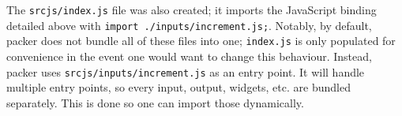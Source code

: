 \documentclass[10pt,]{krantz}
\makeatletter
\newenvironment{Shaded}{\begin{snugshade}}{\end{snugshade}}
\newcommand{\AttributeTok}[1]{\textcolor[rgb]{0.61,0.61,0.61}{#1}}
\newcommand{\ControlFlowTok}[1]{\textcolor[rgb]{0.27,0.27,0.27}{\textbf{#1}}}
\newcommand{\DataTypeTok}[1]{\textcolor[rgb]{0.27,0.27,0.27}{#1}}
\newcommand{\KeywordTok}[1]{\textcolor[rgb]{0.27,0.27,0.27}{\textbf{#1}}}
\newcommand{\NormalTok}[1]{#1}
\newcommand{\OperatorTok}[1]{\textcolor[rgb]{0.43,0.43,0.43}{\textbf{#1}}}
\newcommand{\StringTok}[1]{\textcolor[rgb]{0.5,0.5,0.5}{#1}}
\newcommand{\VariableTok}[1]{\textcolor[rgb]{0,0,0}{#1}}
\newenvironment{kframe}{%
\medskip{}
\setlength{\fboxsep}{.8em}
 \def\at@end@of@kframe{}%
 \ifinner\ifhmode%
  \def\at@end@of@kframe{\end{minipage}}%
  \begin{minipage}{\columnwidth}%
 \fi\fi%
 \def\FrameCommand##1{\hskip\@totalleftmargin \hskip-\fboxsep
 \colorbox{shadecolor}{##1}\hskip-\fboxsep
     \hskip-\linewidth \hskip-\@totalleftmargin \hskip\columnwidth}%
 \MakeFramed {\advance\hsize-\width
   \@totalleftmargin\z@ \linewidth\hsize
   \@setminipage}}%
 {\par\unskip\endMakeFramed%
 \at@end@of@kframe}
\renewenvironment{Shaded}{\begin{kframe}}{\end{kframe}}
\makeatother
\begin{document}
\begin{Shaded}
\end{Shaded}

The \texttt{srcjs/index.js} file was also created; it imports the JavaScript binding detailed above with \texttt{import\ \textquotesingle{}./inputs/increment.js\textquotesingle{};}. Notably, by default, packer does not bundle all of these files into one; \texttt{index.js} is only populated for convenience in the event one would want to change this behaviour. Instead, packer uses \texttt{srcjs/inputs/increment.js} as an entry point. It will handle multiple entry points, so every input, output, widgets, etc. are bundled separately. This is done so one can import those dynamically.
\end{document}
